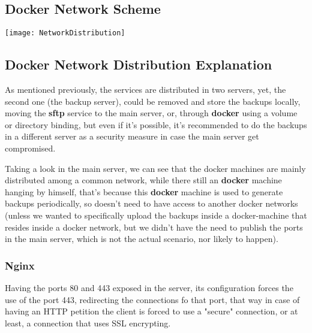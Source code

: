     \subsection{Docker Network Scheme}\label{subsec:ProjectNetworkScheme}
    \begin{center}
    \texttt{[image: NetworkDistribution]}
    \end{center}
    \newpage

    \subsection{Docker Network Distribution Explanation}\label{subsec:dockernetworkdistribution-explanation}
    \begin{flushleft}
        As mentioned previously, the services are distributed in two servers, yet, the second one (the backup server),
        could be removed and store the backups locally, moving the \textbf{sftp} service to the main server, or, through
        \textbf{docker} using a volume or directory binding, but even if it's possible, it's recommended to do the backups in a
        different server as a security measure in case the main server get compromised.
    \end{flushleft}

    \begin{flushleft}
        Taking a look in the main server, we can see that the docker machines are mainly distributed among a common network,
        while there still an \textbf{docker} machine hanging by himself, that's because this \textbf{docker} machine is
        used to generate backups periodically, so doesn't need to have access to another docker networks (unless we wanted to specifically upload
        the backups inside a docker-machine that resides inside a docker network, but we didn't have the need
        to publish the ports in the main server, which is not the actual scenario, nor likely to happen).
    \end{flushleft}


    \subsubsection[Nginx]{Nginx}
    \begin{flushleft}
        Having the ports 80 and 443 exposed in the server, its configuration forces the use of the port 443, redirecting
        the connections fo that port, that way in case of having an HTTP petition the client is forced to use a "secure"
        connection, or at least, a connection that uses SSL encrypting.
    \end{flushleft}

